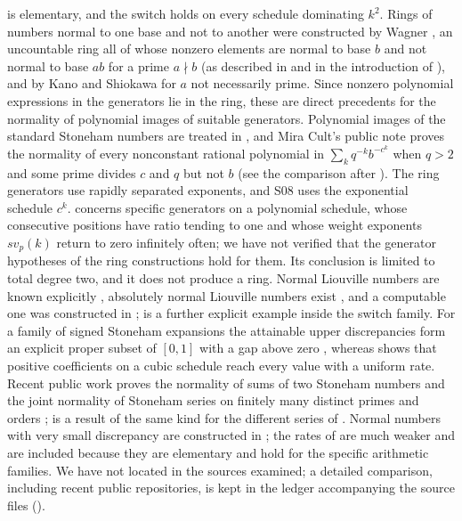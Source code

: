 \documentclass[11pt]{article}
\begin{document}
is elementary, and the switch holds on every schedule dominating $k^2$. Rings of numbers normal to one
base and not to another were constructed by Wagner \cite{Wagner95}, an uncountable ring all of whose
nonzero elements are normal to base $b$ and not normal to base $ab$ for a prime $a\nmid b$ (as described
in \cite[\S1]{Kano93} and in the introduction of \cite{KS93}), and by Kano and Shiokawa
\cite[Theorem~5]{KS93} for $a$ not necessarily prime. Since nonzero polynomial expressions in the
generators lie in the ring, these are direct precedents for the normality of polynomial images of
suitable generators. Polynomial images of the standard Stoneham numbers are treated in \cite{PaperI},
and Mira Cult's public note \cite[Theorem~1.1]{MiraPoly} proves the normality of every nonconstant
rational polynomial in $\sum_kq^{-k}b^{-c^k}$ when $q>2$ and some prime divides $c$ and $q$ but not $b$
(see the comparison after ). The ring generators use rapidly separated exponents,
and S08 uses the exponential schedule $c^k$.  concerns specific generators on a polynomial
schedule, whose consecutive positions have ratio tending to one and whose weight exponents $sv_p(k)$
return to zero infinitely often; we have not verified that the generator hypotheses of the ring
constructions hold for them. Its conclusion is limited to total degree two, and it does not produce a
ring.
Normal Liouville numbers are known explicitly \cite{KS93,BC02}, absolutely normal Liouville numbers
exist \cite{Bugeaud02}, and a computable one was constructed in \cite{BHS15};  is a
further explicit example inside the switch family. For a family of signed Stoneham expansions the
attainable upper discrepancies form an explicit proper subset of $[0,1]$ with a gap above zero
\cite{PaperIII}, whereas  shows that positive coefficients on a cubic schedule reach every
value with a uniform rate. Recent public work proves the normality of sums of two Stoneham numbers \cite{SudeSum} and the
joint normality of Stoneham series on finitely many distinct primes and orders \cite{MiraJoint};
 is a result of the same kind for the different series of . Normal numbers
with very small discrepancy are constructed in \cite{Levin99,ABSS17}; the rates of 
are much weaker and are included because they are elementary and hold for the specific arithmetic
families. We have not located  in the sources examined; a detailed
comparison, including recent public repositories, is kept in the ledger accompanying the source files
().
\end{document}
